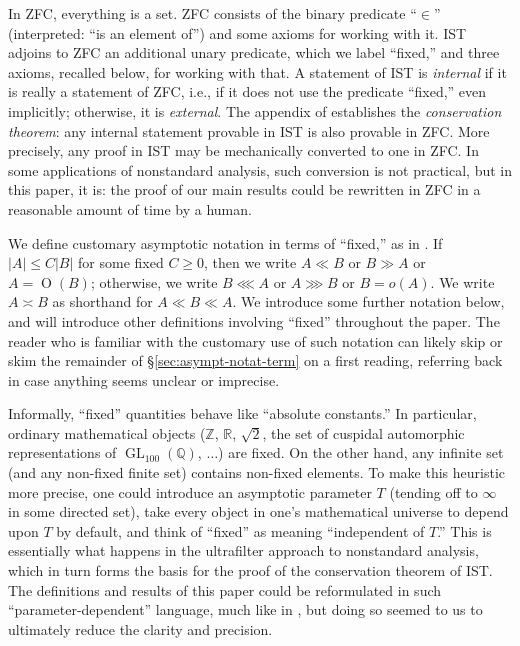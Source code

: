 \documentclass[reqno]{amsart}
\DeclareMathOperator{\GL}{GL}
\def\O{\operatorname{O}}
\theoremstyle{plain} \newtheorem{theorem} {Theorem}
\theoremstyle{definition} \newtheorem{definition} [theorem] {Definition}
\theoremstyle{itplain} %
\numberwithin{equation}{section}
\numberwithin{theorem}{section}
\renewcommand{\geq}{\geqslant}
\renewcommand{\leq}{\leqslant}
\begin{document}
In ZFC, everything is a set.  ZFC consists of the binary predicate ``$\in$'' (interpreted: ``is an element of'') and some axioms for working with it.  IST adjoins to ZFC an additional unary predicate, which we label ``fixed,'' and three axioms, recalled below, for working with that.  A statement of IST is \emph{internal} if it is really a statement of ZFC, i.e., if it does not use the predicate ``fixed,'' even implicitly; otherwise, it is \emph{external}.  The appendix of \cite{MR469763} establishes the \emph{conservation theorem}: any internal statement provable in IST is also provable in ZFC.  More precisely, any proof in IST may be mechanically converted to one in ZFC.  In some applications of nonstandard analysis, such conversion is not practical, but in this paper, it is: the proof of our main results could be rewritten in ZFC in a reasonable amount of time by a human.


We define customary asymptotic notation in terms of ``fixed,'' as in \cite[\S3.1]{2020arXiv201202187N}.  \index{asymptotic notation!$\ll, \lll, \gg, \ggg, \O(\cdot), o(\cdot)$} If $|A| \leq C |B|$ for some fixed $C \geq 0$, then we write $A \ll B$ or $B \gg A$ or $A = \O(B)$; otherwise, we write $B \lll A$ or $A \ggg B$ or $B = o(A)$.  We write $A \asymp B$ as shorthand for $A \ll B \ll A$.  We introduce some further notation below, and will introduce other definitions involving ``fixed'' throughout the paper.  The reader who is familiar with the customary use of such notation can likely skip or skim the remainder of \S\ref{sec:asympt-notat-term} on a first reading, referring back in case anything seems unclear or imprecise.

Informally, ``fixed'' quantities behave like ``absolute constants.''  In particular, ordinary mathematical objects ($\mathbb{Z}$, $\mathbb{R}$, $\sqrt{2}$, the set of cuspidal automorphic representations of $\GL_{100}(\mathbb{Q})$, $\dotsc$) are fixed.  On the other hand, any infinite set (and any non-fixed finite set) contains non-fixed elements.  To make this heuristic more precise, one could introduce an asymptotic parameter $T$ (tending off to $\infty$ in some directed set), take every object in one's mathematical universe to depend upon $T$ by default, and think of ``fixed'' as meaning ``independent of $T$.''  This is essentially what happens in the ultrafilter approach to nonstandard analysis, which in turn forms the basis for the proof of the conservation theorem of IST.  The definitions and results of this paper could be reformulated in such ``parameter-dependent'' language, much like in \cite{nelson-venkatesh-1}, but doing so seemed to us to ultimately reduce the clarity and precision.
\end{document}
